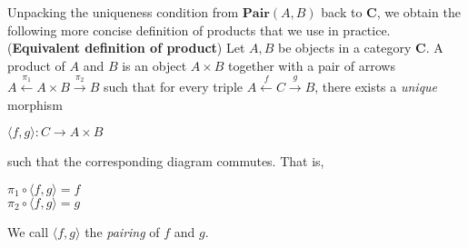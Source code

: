 \documentclass[]{amsbook}
\newcommand{\catname}[1]{\mathbf{#1}}
\newcommand{\0}{\mathbf{0}}
\newcommand{\1}{\mathbf{1}}
\begin{document}
Unpacking the uniqueness condition from $\catname{Pair}(A, B)$ back to
$\catname{C}$, we obtain the following more concise definition of products that
we use in practice.\\

(\textbf{Equivalent definition of product}) Let $A, B$ be objects in a category
$\catname{C}$. A product of $A$ and $B$ is an object $A \times B$ together with
a pair of arrows $A \xleftarrow{\pi_1} A \times B \xrightarrow{\pi_2} B$ such
that for every triple $A \xleftarrow{f} C \xrightarrow{g} B$, there exists a
\emph{unique} morphism
\begin{center}
    $\langle f, g \rangle : C \to A \times B$
\end{center}
such that the corresponding diagram commutes. That is,
\begin{center}
    $\pi_1 \circ \langle f, g \rangle = f$\\
    $\pi_2 \circ \langle f, g \rangle = g$
\end{center}
We call $\langle f, g \rangle$ the \emph{pairing} of $f$ and $g$.
\end{document}
